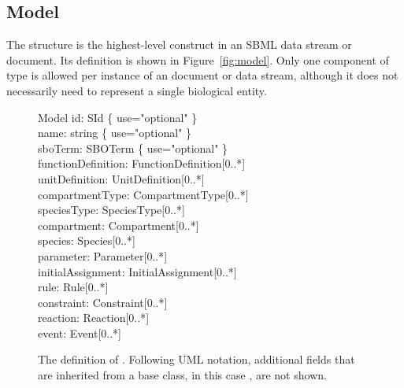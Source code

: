 \subsection{Model}
\label{sec:model}

The \Model structure is the highest-level construct in an SBML
data stream or document.  Its definition is shown in
Figure~\vref{fig:model}.  Only one component of type \Model is
allowed per instance of an \sbmltwotwo document or data stream,
although it does not necessarily need to represent a single
biological entity.

\begin{figure}[htb]
  \centering
  \begin{classbox}{Model}
    id: SId  \{ use="optional" \}                        \\
    name: string \{ use="optional" \}                    \\
    sboTerm: SBOTerm \{ use="optional" \}      \\
    functionDefinition: FunctionDefinition[0..*]         \\
    unitDefinition: UnitDefinition[0..*]                 \\
    compartmentType: CompartmentType[0..*]     \\
    speciesType: SpeciesType[0..*]             \\
    compartment: Compartment[0..*]                       \\
    species: Species[0..*]                               \\
    parameter: Parameter[0..*]                           \\
    initialAssignment: InitialAssignment[0..*] \\
    rule: Rule[0..*]                                     \\
    constraint: Constraint[0..*]               \\
    reaction: Reaction[0..*]                             \\
    event: Event[0..*]                                   \\
  \end{classbox}
  \caption{The definition of \Model.  Following UML notation, additional fields
    that are inherited from a base class, in this case \SBase, are not shown.}
  \label{fig:model}
\end{figure}

